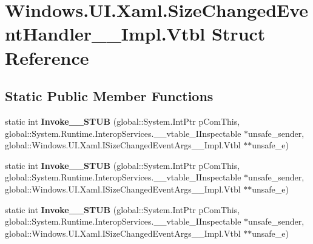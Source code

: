 \hypertarget{struct_windows_1_1_u_i_1_1_xaml_1_1_size_changed_event_handler_____impl_1_1_vtbl}{}\section{Windows.\+U\+I.\+Xaml.\+Size\+Changed\+Event\+Handler\+\_\+\+\_\+\+Impl.\+Vtbl Struct Reference}
\label{struct_windows_1_1_u_i_1_1_xaml_1_1_size_changed_event_handler_____impl_1_1_vtbl}
\subsection*{Static Public Member Functions}
\begin{DoxyCompactItemize}
\item 
\mbox{\label{struct_windows_1_1_u_i_1_1_xaml_1_1_size_changed_event_handler_____impl_1_1_vtbl_a73571ba66e8c41853a572f6baee8574d}} 
static int {\bfseries Invoke\+\_\+\+\_\+\+S\+T\+UB} (global\+::\+System.\+Int\+Ptr p\+Com\+This, global\+::\+System.\+Runtime.\+Interop\+Services.\+\_\+\+\_\+vtable\+\_\+\+I\+Inspectable $\ast$unsafe\+\_\+sender, global\+::\+Windows.\+U\+I.\+Xaml.\+I\+Size\+Changed\+Event\+Args\+\_\+\+\_\+\+Impl.\+Vtbl $\ast$$\ast$unsafe\+\_\+e)
\item 
\mbox{\label{struct_windows_1_1_u_i_1_1_xaml_1_1_size_changed_event_handler_____impl_1_1_vtbl_a73571ba66e8c41853a572f6baee8574d}} 
static int {\bfseries Invoke\+\_\+\+\_\+\+S\+T\+UB} (global\+::\+System.\+Int\+Ptr p\+Com\+This, global\+::\+System.\+Runtime.\+Interop\+Services.\+\_\+\+\_\+vtable\+\_\+\+I\+Inspectable $\ast$unsafe\+\_\+sender, global\+::\+Windows.\+U\+I.\+Xaml.\+I\+Size\+Changed\+Event\+Args\+\_\+\+\_\+\+Impl.\+Vtbl $\ast$$\ast$unsafe\+\_\+e)
\item 
\mbox{\label{struct_windows_1_1_u_i_1_1_xaml_1_1_size_changed_event_handler_____impl_1_1_vtbl_a73571ba66e8c41853a572f6baee8574d}} 
static int {\bfseries Invoke\+\_\+\+\_\+\+S\+T\+UB} (global\+::\+System.\+Int\+Ptr p\+Com\+This, global\+::\+System.\+Runtime.\+Interop\+Services.\+\_\+\+\_\+vtable\+\_\+\+I\+Inspectable $\ast$unsafe\+\_\+sender, global\+::\+Windows.\+U\+I.\+Xaml.\+I\+Size\+Changed\+Event\+Args\+\_\+\+\_\+\+Impl.\+Vtbl $\ast$$\ast$unsafe\+\_\+e)
$$
\end{DoxyCompactItemize}
